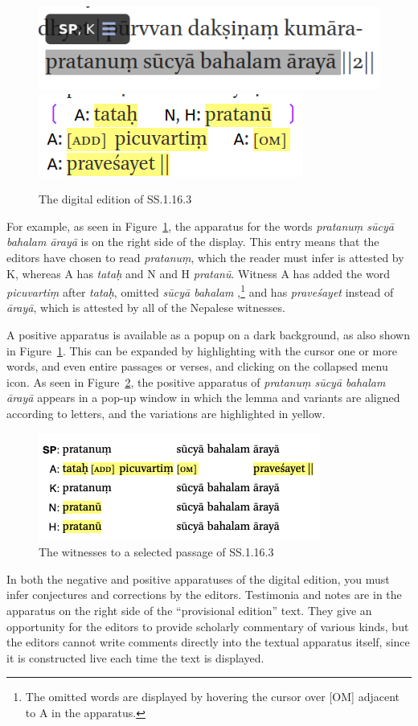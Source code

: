 \begin{figure}[t]
    \centering
    \includegraphics[draft=false,width=.5\textwidth]{media/SS.1.16.3c}
    \quad
    \includegraphics[draft=false,width=.35\textwidth]{media/SS.1.16.3d}
    \caption{The digital edition of SS.1.16.3}
    \label{SS.1.16}
\end{figure}
For example, as seen in Figure~\ref{SS.1.16}, the apparatus for the words 
\emph{pratanuṃ sūcyā bahalam ārayā} is on the right side of the display. 
This entry means that the editors have chosen to read 
\emph{pratanuṃ}, which the reader must infer is attested by K, whereas A has 
\emph{tataḥ} and N and H \emph{pratanū}. Witness A has added the word \emph{picuvartiṃ} after \emph{tataḥ}, omitted \emph{sūcyā bahalam },\footnote{The omitted words are displayed by hovering the cursor over [OM] adjacent to A in the apparatus.} and has \emph{praveśayet} instead of \emph{ārayā}, which is attested by all of the Nepalese witnesses. 

A positive apparatus is available as a popup on a dark background, as also shown
in Figure~\ref{SS.1.16}.  This can be expanded by highlighting with the cursor one
or more words, and even entire passages or verses, and clicking on the collapsed menu
icon. As seen in Figure~\ref{SS.1.16.3}, the positive apparatus of \emph{pratanuṃ
    sūcyā bahalam ārayā} appears in a pop-up window in which the lemma and variants
are aligned according to letters, and the variations are highlighted in yellow.

\begin{figure}[t]
    \centering
    \includegraphics[draft=false,width=.8\textwidth]{media/SS.1.16b.positive}
    \caption{The witnesses to a selected passage of SS.1.16.3}
    \label{SS.1.16.3}
\end{figure}

In both the negative and positive apparatuses of the digital edition, you must
infer conjectures and corrections by the editors. Testimonia and notes are in the
apparatus on the right side of the “provisional edition” text.  They give an
opportunity for the editors to provide scholarly commentary of various kinds, but
the editors cannot write comments directly into the textual apparatus itself,
since it is constructed live each time the text is displayed.





